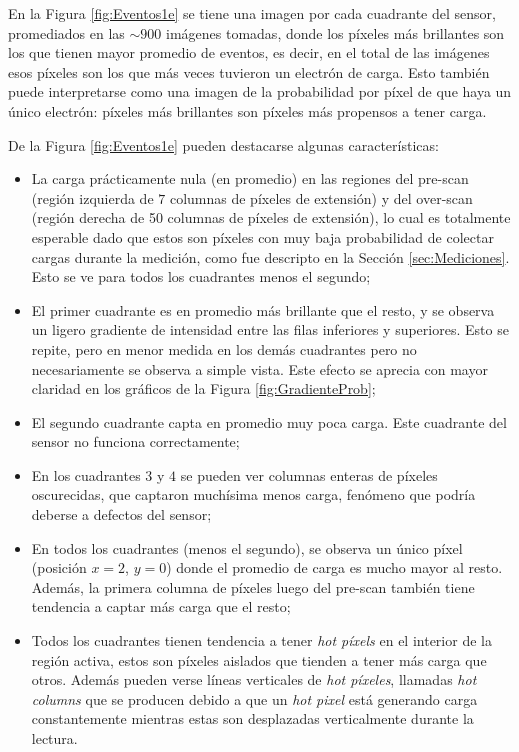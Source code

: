 En la Figura \ref{fig:Eventos1e} se tiene una imagen por cada cuadrante del sensor, promediados en las $\sim 900$ imágenes tomadas, donde los píxeles más brillantes son los que tienen mayor promedio de eventos, es decir, en el total de las imágenes esos píxeles son los que más veces tuvieron un electrón de carga. Esto también puede interpretarse como una imagen de la probabilidad por píxel de que haya un único electrón: píxeles más brillantes son píxeles más propensos a tener carga.

De la Figura \ref{fig:Eventos1e} pueden destacarse algunas características:
\begin{itemize}
    \item La carga prácticamente nula (en promedio) en las regiones del pre-scan (región izquierda de $7$ columnas de píxeles de extensión) y del over-scan (región derecha de 50 columnas de píxeles de extensión), lo cual es totalmente esperable dado que estos son píxeles con muy baja probabilidad de colectar cargas durante la medición, como fue descripto en la Sección \ref{sec:Mediciones}. Esto se ve para todos los cuadrantes menos el segundo;
    \item El primer cuadrante es en promedio más brillante que el resto, y se observa un ligero gradiente de intensidad entre las filas inferiores y superiores. Esto se repite, pero en menor medida en los demás cuadrantes pero no necesariamente se observa a simple vista. Este efecto se aprecia con mayor claridad en los gráficos de la Figura \ref{fig:GradienteProb};
    \item El segundo cuadrante capta en promedio muy poca carga. Este cuadrante del sensor no funciona correctamente;
    \item En los cuadrantes $3$ y $4$ se pueden ver columnas enteras de píxeles oscurecidas, que captaron muchísima menos carga, fenómeno que podría deberse a defectos del sensor;
    \item En todos los cuadrantes (menos el segundo), se observa un único píxel (posición $x = 2$, $y = 0$) donde el promedio de carga es mucho mayor al resto. Además, la primera columna de píxeles luego del pre-scan también tiene tendencia a captar más carga que el resto;
    \item Todos los cuadrantes tienen tendencia a tener \textit{hot píxels} en el interior de la región activa, estos son píxeles aislados que tienden a tener más carga que otros. Además pueden verse líneas verticales de \textit{hot píxeles}, llamadas \textit{hot columns} que se producen debido a que un \textit{hot pixel} está generando carga constantemente mientras estas son desplazadas verticalmente durante la lectura.
\end{itemize}
